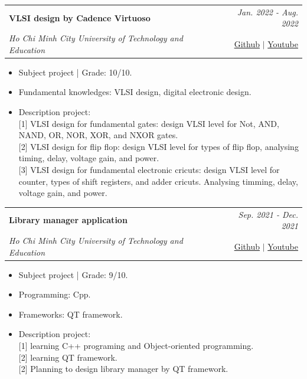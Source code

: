 \documentclass[a4paper,11pt]{article}
\makeatletter
\newcommand{\resumeProject}[4]{
\vspace{0.5mm}\item
    \begin{tabular*}{0.98\textwidth}[t]{l@{\extracolsep{\fill}}r}
        \textbf{#1} & \textit{\footnotesize{#3}} \\
        \footnotesize{\textit{#2}} & \footnotesize{#4}
    \end{tabular*}
    \vspace{-2.4mm}
}
\newcommand{\resumeItemListStart}{\begin{justify}\begin{itemize}[leftmargin=3ex, rightmargin=2ex, noitemsep,labelsep=1.2mm,itemsep=0mm]\small}
\newcommand{\resumeItemListEnd}{\end{itemize}\end{justify}\vspace{-2mm}}
\makeatother
\begin{document}
    \resumeProject
      {VLSI design by Cadence Virtuoso} %
      {Ho Chi Minh City University of Technology and Education} %
      {Jan. 2022 - Aug. 2022} %
      {\href{https://github.com/Winxkin/VLSI_Lab}{Github} $|$ \href{https://www.youtube.com/watch?v=8D4A5gXhkC0}{Youtube}} %
      \resumeItemListStart
        \item{Subject project | Grade: 10/10.}
        \item {Fundamental knowledges: VLSI design, digital electronic design.}
        \item {Description project:}\hfill
        \\ {[1] VLSI design for fundamental gates: design VLSI level for Not, AND, NAND, OR, NOR, XOR, and NXOR gates.}
        \\ {[2] VLSI design for flip flop: design VLSI level for types of flip flop, analysing timing, delay, voltage gain, and power.}
        \\ {[3] VLSI design for fundamental electronic cricuts: design VLSI level for counter, types of shift registers, and adder cricuts. Analysing timming, delay, voltage gain, and power.}
    \resumeItemListEnd

    \resumeProject
      {Library manager application} %
      {Ho Chi Minh City University of Technology and Education} %
      {Sep. 2021 - Dec. 2021} %
      {\href{https://github.com/Winxkin/libManager}{Github} $|$ \href{https://www.youtube.com/watch?v=QobJnvS4IBI}{Youtube}} %
      \resumeItemListStart
        \item {Subject project | Grade: 9/10.}
        \item {Programming: Cpp.}
        \item {Frameworks: QT framework.}
        \item {Description project:}\hfill
        \\ {[1] learning C++ programing and Object-oriented programming.}
        \\ {[2] learning QT framework.}
        \\ {[2] Planning to design library manager by QT framework.}
    \resumeItemListEnd
    
\end{document}
